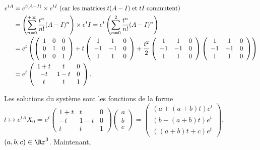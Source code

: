 {\begin{enumerate}
{\begin{align*}\ensuremath
e^{tA}&=e^{t(A-I)}\times e^{tI}\;(\text{car les matrices}\;t(A-I)\;\text{et}\;tI\;\text{commutent})\\
 &=\left(\sum_{n=0}^{+\infty} \frac{t^n}{n!}(A-I)^n\right)\times e^tI=e^t\left(\sum_{n=0}^{2} \frac{t^n}{n!}(A-I)^n\right)\\
 &=e^t\left(\left(
 \begin{array}{ccc}
 1&0&0\\
 0&1&0\\
 0&0&1
 \end{array}
 \right)+t\left(
 \begin{array}{ccc}
 1&1&0\\
 -1&-1&0\\
 1&1&0
 \end{array}
 \right)+ \frac{t^2}{2}\left(
 \begin{array}{ccc}
 1&1&0\\
 -1&-1&0\\
 1&1&0
 \end{array}
 \right)\left(
 \begin{array}{ccc}
 1&1&0\\
 -1&-1&0\\
 1&1&0
 \end{array}
 \right)\right)\\
 &=e^t\left(
 \begin{array}{ccc}
 1+t&t&0\\
 -t&1-t&0\\
 t&t&1
 \end{array}
 \right).
\end{align*}

Les solutions du système sont les fonctions de la forme $t\mapsto e^{tA}X_0=e^t\left(
 \begin{array}{ccc}
 1+t&t&0\\
 -t&1-t&0\\
 t&t&1
 \end{array}
 \right)\left(
 \begin{array}{c}
 a\\
 b\\
 c
 \end{array}
 \right)=\left(
 \begin{array}{c}
 (a+(a+b)t)e^t\\
 (b-(a+b)t)e^t\\
 ((a+b)t+c)e^t
 \end{array}
 \right)$, $(a,b,c)\in\Rr^3$. Maintenant,
 
}
\end{enumerate}}
